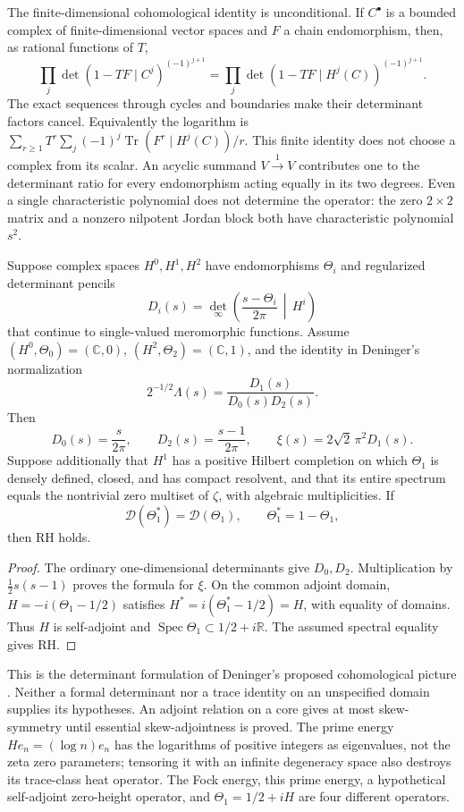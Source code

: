 The finite-dimensional cohomological identity is unconditional.
If $C^\bullet$ is a bounded complex of finite-dimensional vector spaces and
$F$ a chain endomorphism, then, as rational functions of $T$,
\[
 \prod_j\det(1-TF\mid C^j)^{(-1)^{j+1}}
 =\prod_j\det(1-TF\mid H^j(C))^{(-1)^{j+1}}.
\]
The exact sequences through cycles and boundaries make their determinant
factors cancel.  Equivalently the logarithm is
$\sum_{r\geq1}T^r\sum_j(-1)^j\operatorname{Tr}(F^r\mid H^j(C))/r$.
This finite identity does not choose a complex from its scalar.
An acyclic summand $V\xrightarrow{1}V$ contributes one to the determinant
ratio for every endomorphism acting equally in its two degrees.
Even a single characteristic polynomial does not determine the operator:
the zero $2\times2$ matrix and a nonzero nilpotent Jordan block both have
characteristic polynomial $s^2$.

\begin{proposition}
\label{syn-arith:determinant-transfer}
Suppose complex spaces $H^0,H^1,H^2$ have endomorphisms $\Theta_i$ and
regularized determinant pencils
\[
 D_i(s)=\det_\infty\left(\frac{s-\Theta_i}{2\pi}\,\middle|\,H^i\right)
\]
that continue to single-valued meromorphic functions.
Assume $(H^0,\Theta_0)=(\mathbb C,0)$, $(H^2,\Theta_2)=(\mathbb C,1)$,
and the identity in Deninger's normalization
\[
 2^{-1/2}\Lambda(s)=\frac{D_1(s)}{D_0(s)D_2(s)}.
\]
Then
\[
 D_0(s)=\frac{s}{2\pi},\qquad D_2(s)=\frac{s-1}{2\pi},\qquad
 \xi(s)=2\sqrt2\,\pi^2D_1(s).
\]
Suppose additionally that $H^1$ has a positive Hilbert completion on which
$\Theta_1$ is densely defined, closed, and has compact resolvent, and that
its entire spectrum equals the nontrivial zero multiset of $\zeta$, with
algebraic multiplicities.  If
\[
 \mathcal D(\Theta_1^*)=\mathcal D(\Theta_1),\qquad
 \Theta_1^*=1-\Theta_1,
\]
then RH holds.
\end{proposition}
\begin{proof}
The ordinary one-dimensional determinants give $D_0,D_2$.
Multiplication by $\tfrac12s(s-1)$ proves the formula for $\xi$.
On the common adjoint domain,
$H=-i(\Theta_1-1/2)$ satisfies
$H^*=i(\Theta_1^*-1/2)=H$, with equality of domains.
Thus $H$ is self-adjoint and $\operatorname{Spec}\Theta_1\subset1/2+i\mathbb R$.
The assumed spectral equality gives RH.
\end{proof}

This is the determinant formulation of Deninger's proposed cohomological
picture \cite[\S3, equation~(3)]{syn-arith:Deninger}.
Neither a formal determinant nor a trace identity on an unspecified domain
supplies its hypotheses.  An adjoint relation on a core gives at most
skew-symmetry until essential skew-adjointness is proved.
The prime energy $He_n=(\log n)e_n$ has the logarithms of positive integers
as eigenvalues, not the zeta zero parameters; tensoring it with an infinite
degeneracy space also destroys its trace-class heat operator.
The Fock energy, this prime energy, a hypothetical self-adjoint zero-height
operator, and $\Theta_1=1/2+iH$ are four different operators.

